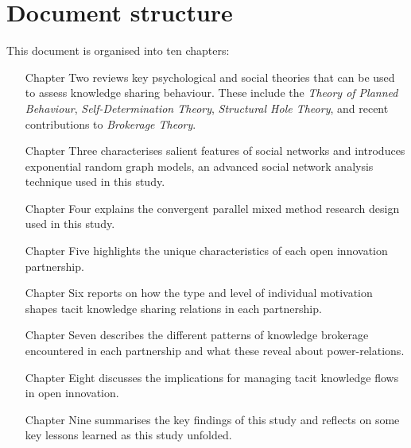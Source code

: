 \section{Document structure}

This document is organised into ten chapters:

\begin{itemize}
	\item[Chapter Two] reviews key psychological and social theories that can be used to assess knowledge sharing behaviour. These include the \emph{Theory of Planned Behaviour}, \emph{Self-Determination Theory}, \emph{Structural Hole Theory}, and recent contributions to \emph{Brokerage Theory}.
	\item[Chapter Three] characterises salient features of social networks and introduces exponential random graph models, an advanced social network analysis technique used in this study.
	\item[Chapter Four] explains the convergent parallel mixed method research design used in this study. 
	\item[Chapter Five] highlights the unique characteristics of each open innovation partnership.
	\item[Chapter Six] reports on how the type and level of individual motivation shapes tacit knowledge sharing relations in each partnership.
	\item[Chapter Seven] describes the different patterns of knowledge brokerage encountered in each partnership and what these reveal about power-relations.
	\item[Chapter Eight] discusses the implications for managing tacit knowledge flows in open innovation.
	\item[Chapter Nine] summarises the key findings of this study and reflects on some key lessons learned as this study unfolded.        
\end{itemize}
